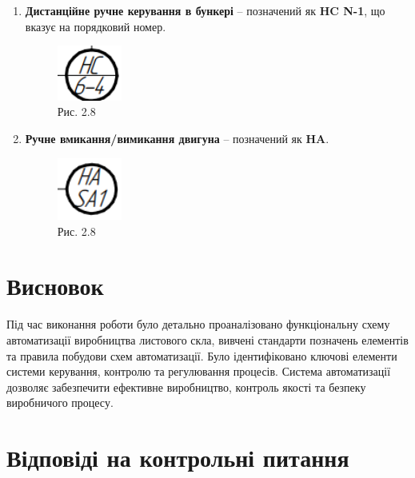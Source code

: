 \documentclass[a4paper]{article}
\begin{document}
\begin{enumerate}
    \item \textbf{ Дистанційне ручне керування в бункері } – позначений як \textbf{HC N-1}, що вказує на порядковий номер.
\begin{figure}[h]
    \centering
    \includegraphics[width=0.2\textwidth] 
           {imgs/PW2.8.png}
    \caption*{Рис. 2.8}
\end{figure} 

    \item \textbf{Ручне вмикання/вимикання двигуна } – позначений як \textbf{HA}.
\begin{figure}[h]
    \centering
    \includegraphics[width=0.2\textwidth] 
           {imgs/PW2.9.png}
    \caption*{Рис. 2.8}
\end{figure} 
\end{enumerate}


\section*{Висновок}
Під час виконання роботи було детально проаналізовано функціональну схему автоматизації виробництва листового скла, вивчені стандарти позначень елементів та правила побудови схем автоматизації. Було ідентифіковано ключові елементи системи керування, контролю та регулювання процесів. Система автоматизації дозволяє забезпечити ефективне виробництво, контроль якості та безпеку виробничого процесу.


\section*{Відповіді на контрольні питання}
\end{document}
